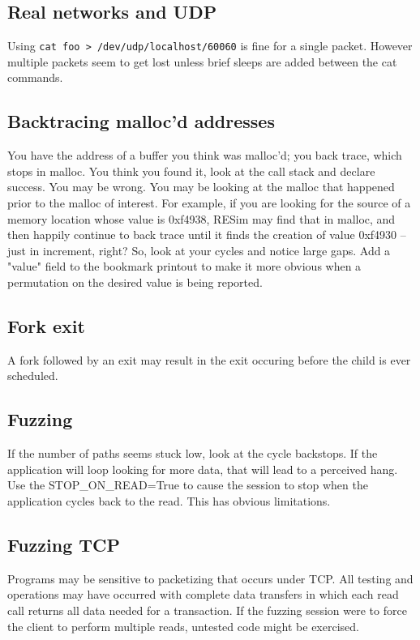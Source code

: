\documentclass[titlepage]{article}
\begin{document}
\begin{appendices}
\subsection{Real networks and UDP}
Using {\tt cat foo > /dev/udp/localhost/60060} is fine for a single packet.  However multiple packets seem to get lost unless brief sleeps are
added between the cat commands.

\subsection{Backtracing malloc'd addresses}
You have the address of a buffer you think was malloc'd; you back trace, which stops in malloc.  You think you found it, look at the call stack and
declare success.  You may be wrong.  You may be looking at the malloc that happened prior to the malloc of interest.  For example, if you are looking
for the source of a memory location whose value is 0xf4938, RESim may find that in malloc, and then happily continue to back trace until it finds
the creation of value 0xf4930  -- just in increment, right?  So, look at your cycles and notice large gaps.
Add a "value" field to the bookmark printout to make it more obvious when a permutation on the desired value is being reported.

\subsection{Fork exit}
A fork followed by an exit may result in the exit occuring before the child is ever scheduled.

\subsection{Fuzzing}
If the number of paths seems stuck low, look at the cycle backstops.  If the application will loop looking for more data, that will lead to a perceived
hang.  Use the STOP\_ON\_READ=True to cause the session to stop when the application cycles back to the read.  This has obvious limitations.
\subsection{Fuzzing TCP}
Programs may be sensitive to packetizing that occurs under TCP.  All testing and operations may have occurred with
complete data transfers in which each read call returns all data needed for a transaction.  If the fuzzing session
were to force the client to perform multiple reads, untested code might be exercised.


\end{appendices}
\end{document}
